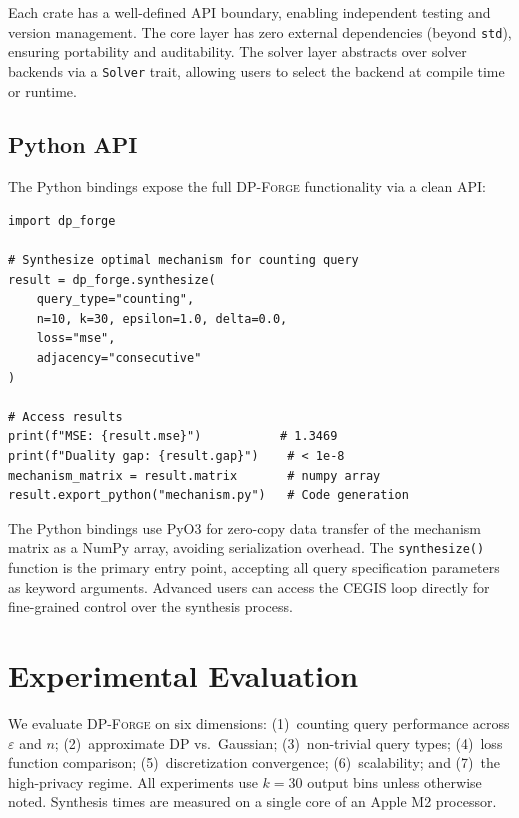 \documentclass[11pt,a4paper]{article}
\newcommand{\dpforge}{\textsc{DP-Forge}}
\newcommand{\eps}{\varepsilon}
\begin{document}
Each crate has a well-defined API boundary, enabling independent testing and
version management.  The core layer has zero external dependencies (beyond
\texttt{std}), ensuring portability and auditability.  The solver layer
abstracts over solver backends via a \texttt{Solver} trait, allowing users
to select the backend at compile time or runtime.

\subsection{Python API}
\label{subsec:pythonapi}

The Python bindings expose the full \dpforge{} functionality via a clean API:

\begin{verbatim}
import dp_forge

# Synthesize optimal mechanism for counting query
result = dp_forge.synthesize(
    query_type="counting",
    n=10, k=30, epsilon=1.0, delta=0.0,
    loss="mse",
    adjacency="consecutive"
)

# Access results
print(f"MSE: {result.mse}")           # 1.3469
print(f"Duality gap: {result.gap}")    # < 1e-8
mechanism_matrix = result.matrix       # numpy array
result.export_python("mechanism.py")   # Code generation
\end{verbatim}

The Python bindings use PyO3 for zero-copy data transfer of the mechanism matrix
as a NumPy array, avoiding serialization overhead.  The \texttt{synthesize()}
function is the primary entry point, accepting all query specification parameters
as keyword arguments.  Advanced users can access the CEGIS loop directly for
fine-grained control over the synthesis process.


\section{Experimental Evaluation}
\label{sec:experiments}

We evaluate \dpforge{} on six dimensions: (1)~counting query performance across
$\eps$ and $n$; (2)~approximate DP vs.\ Gaussian; (3)~non-trivial query types;
(4)~loss function comparison; (5)~discretization convergence; (6)~scalability;
and (7)~the high-privacy regime.  All experiments use $k=30$ output bins unless
otherwise noted.  Synthesis times are measured on a single core of an Apple M2
processor.
\end{document}
